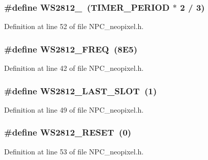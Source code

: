 \subsubsection[{\texorpdfstring{W\+S2812\+\_\+1}{WS2812_1}}]{\setlength{\rightskip}{0pt plus 5cm}\#define W\+S2812\+\_~({\bf T\+I\+M\+E\+R\+\_\+\+P\+E\+R\+I\+OD} $\ast$ 2 / 3)}\hypertarget{group___constant_gad4cec7bff3f072ffe9ec1e11324c7418}{}\label{group___constant_gad4cec7bff3f072ffe9ec1e11324c7418}


Definition at line 52 of file N\+P\+C\+\_\+neopixel.\+h.

\subsubsection[{\texorpdfstring{W\+S2812\+\_\+\+F\+R\+EQ}{WS2812_FREQ}}]{\setlength{\rightskip}{0pt plus 5cm}\#define W\+S2812\+\_\+\+F\+R\+EQ~(8\+E5)}\hypertarget{group___constant_ga857df980c46f31dbe009560d826413a8}{}\label{group___constant_ga857df980c46f31dbe009560d826413a8}


Definition at line 42 of file N\+P\+C\+\_\+neopixel.\+h.

\subsubsection[{\texorpdfstring{W\+S2812\+\_\+\+L\+A\+S\+T\+\_\+\+S\+L\+OT}{WS2812_LAST_SLOT}}]{\setlength{\rightskip}{0pt plus 5cm}\#define W\+S2812\+\_\+\+L\+A\+S\+T\+\_\+\+S\+L\+OT~(1)}\hypertarget{group___constant_gacbccf04b27120fd8ba0a8eae7866291f}{}\label{group___constant_gacbccf04b27120fd8ba0a8eae7866291f}


Definition at line 49 of file N\+P\+C\+\_\+neopixel.\+h.

\subsubsection[{\texorpdfstring{W\+S2812\+\_\+\+R\+E\+S\+ET}{WS2812_RESET}}]{\setlength{\rightskip}{0pt plus 5cm}\#define W\+S2812\+\_\+\+R\+E\+S\+ET~(0)}\hypertarget{group___constant_gaef8a90792d52a7085de6c0affec15557}{}\label{group___constant_gaef8a90792d52a7085de6c0affec15557}


Definition at line 53 of file N\+P\+C\+\_\+neopixel.\+h.

